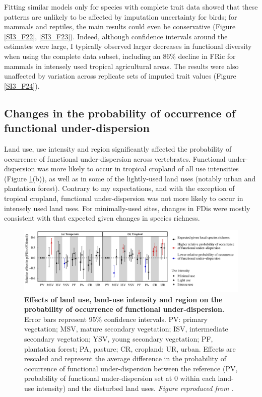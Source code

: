 Fitting similar models only for species with complete trait data showed that these patterns are unlikely to be affected by imputation uncertainty for birds; for mammals and reptiles, the main results could even be conservative (Figure \ref{SI3_F22}, \ref{SI3_F23}). Indeed, although confidence intervals around the estimates were large, I typically observed larger decreases in functional diversity when using the complete data subset, including an 86\% decline in FRic for mammals in intensely used tropical agricultural areas. The results were also unaffected by variation across replicate sets of imputed trait values (Figure \ref{SI3_F24}).

\clearpage

\subsection{Changes in the probability of occurrence of functional under-dispersion}

Land use, use intensity and region significantly affected the probability of occurrence of functional under-dispersion across vertebrates. Functional under-dispersion was more likely to occur in tropical cropland of all use intensities (Figure \ref{chap3_fig4}(b)), as well as in some of the lightly-used land uses (notably urban and plantation forest). Contrary to my expectations, and with the exception of tropical cropland, functional under-dispersion was not more likely to occur in intensely used land uses. For minimally-used sites, changes in FDis were mostly consistent with that expected given changes in species richness.

\begin{figure}[h!]
\centering
\includegraphics[scale=0.75]{figures/Chapter_FD/Figure4}
\caption[Effects of land use, land-use intensity and region on the probability of occurrence of functional under-dispersion.]{\textbf{Effects of land use, land-use intensity and region on the probability of occurrence of functional under-dispersion.} Error bars represent 95\% confidence intervals. PV: primary vegetation; MSV, mature secondary vegetation; ISV, intermediate secondary vegetation; YSV, young secondary vegetation; PF, plantation forest; PA, pasture; CR, cropland; UR, urban. Effects are rescaled and represent the average difference in the probability of occurrence of functional under-dispersion between the reference (PV, probability of functional under-dispersion set at 0 within each land-use intensity) and the disturbed land uses. \textit{Figure reproduced from \citet{Etard2021}.}}
\label{chap3_fig4}
\end{figure}

